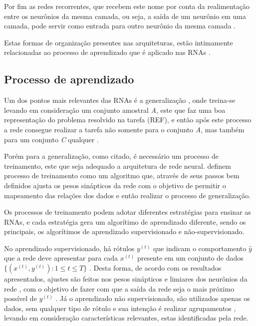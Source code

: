\par Por fim as redes recorrentes, que recebem este nome por conta da realimentação entre os neurônios da mesma camada, ou seja, a saída de um neurônio em uma camada, pode servir como entrada para outro neurônio da mesma camada \cite{Nelson2017}.

\par Estas formas de organização presentes nas arquiteturas, estão intimamente relacionadas ao processo de aprendizado que é aplicado nas RNAs \cite{Haykin2001}.

\subsection{Processo de aprendizado}

\par Um dos pontos mais relevantes das RNAs é a generalização \cite{livroNunes2016}, onde treina-se levando em consideração um conjunto amostral \textit{A}, este que faz uma boa representação do problema resolvido na tarefa (REF), e então após este processo a rede consegue realizar a tarefa não somente para o conjunto \textit{A}, mas também para um conjunto \textit{C} qualquer \cite{livroNunes2016}.

\par Porém para a generalização, como citado, é necessário um processo de treinamento, este que seja adequado a arquitetura de rede neural.  definem processo de treinamento como um algoritmo que, através de seus passos bem definidos ajusta os pesos sinápticos da rede com o objetivo de permitir o mapeamento das relações dos dados e então realizar o processo de generalização. 

\par Os processos de treinamento podem adotar diferentes estratégias para ensinar as RNAs, e cada estratégia gera um algorítimo de aprendizado diferente, sendo os principais, os algorítimos de aprendizado supervisionado e não-supervisionado.

\par No aprendizado supervisionado, há rótulos $y^{(t)}$ que indicam o comportamento $\widehat{y}$ que a rede deve apresentar para cada $x^{(t)}$ presente em um conjunto de dados $\{(x^{(t)}, y^{(t)}): 1 \leqslant t \leqslant T\}$ \cite{bezerra2016}. Desta forma, de acordo com os resultados apresentados, ajustes são feitos nos pesos sinápticos e limiares dos neurônios da rede \cite{livroNunes2016}, com o objetivo de fazer com que a saída da rede seja o mais próximo possível de $y^{(t)}$ \cite{Osorio1999}. Já o aprendizado não supervisionado, são utilizados apenas os dados, sem qualquer tipo de rótulo e sua intenção é realizar agrupamentos \cite{Camila2017}, levando em consideração características relevantes, estas identificadas pela rede.

